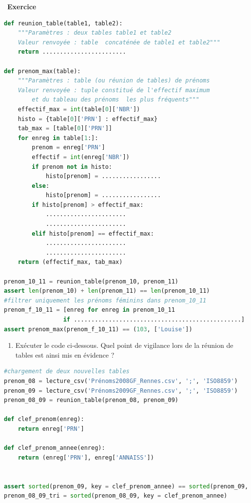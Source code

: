 \documentclass[
  11pt,
]{article}
\providecommand{\tightlist}{%
  \setlength{\itemsep}{0pt}\setlength{\parskip}{0pt}}
\newcounter{exo}
\newenvironment{exercice}[1]
{\par \medskip   \addtocounter{exo}{1} \noindent  
\begin{bclogo}[arrondi =0.1,   noborder = true, logo=\bccrayon, marge=4]{~\textbf{Exercice} \textbf{\theexo} {\itshape #1} }  \par}
{
\end{bclogo}
 \par \bigskip }
\newcounter{def}
\newcounter{histo}
\begin{document}
\begin{exercice}{}
\begin{lstlisting}[language=Python]
def reunion_table(table1, table2):
    """Paramètres : deux tables table1 et table2
    Valeur renvoyée : table  concaténée de table1 et table2"""
    return ........................

def prenom_max(table):
    """Paramètres : table (ou réunion de tables) de prénoms 
    Valeur renvoyée : tuple constitué de l'effectif maximum
        et du tableau des prénoms  les plus fréquents"""
    effectif_max = int(table[0]['NBR'])
    histo = {table[0]['PRN'] : effectif_max}   
    tab_max = [table[0]['PRN']]
    for enreg in table[1:]:
        prenom = enreg['PRN']
        effectif = int(enreg['NBR'])
        if prenom not in histo:
            histo[prenom] = .................
        else:
            histo[prenom] = .................
        if histo[prenom] > effectif_max:
            .......................
            .......................
        elif histo[prenom] == effectif_max:
            .......................
            .......................
    return (effectif_max, tab_max)      

prenom_10_11 = reunion_table(prenom_10, prenom_11)
assert len(prenom_10) + len(prenom_11) == len(prenom_10_11)
#filtrer uniquement les prénoms féminins dans prenom_10_11
prenom_f_10_11 = [enreg for enreg in prenom_10_11 
                 if ................................................]
assert prenom_max(prenom_f_10_11) == (103, ['Louise'])
\end{lstlisting}

\begin{enumerate}
\def\labelenumi{\arabic{enumi}.}
\setcounter{enumi}{4}
\tightlist
\item
  Exécuter le code ci-dessous. Quel point de vigilance lors de la
  réunion de tables est ainsi mis en évidence ?
\end{enumerate}

\begin{lstlisting}[language=Python]
#chargement de deux nouvelles tables
prenom_08 = lecture_csv('Prénoms2008GF_Rennes.csv', ';', 'ISO8859')
prenom_09 = lecture_csv('Prénoms2009GF_Rennes.csv', ';', 'ISO8859')
prenom_08_09 = reunion_table(prenom_08, prenom_09)

def clef_prenom(enreg):
    return enreg['PRN']

def clef_prenom_annee(enreg):
    return (enreg['PRN'], enreg['ANNAISS'])


assert sorted(prenom_09, key = clef_prenom_annee) == sorted(prenom_09, key = clef_prenom)
prenom_08_09_tri = sorted(prenom_08_09, key = clef_prenom_annee) 
\end{lstlisting}


\end{exercice}
\end{document}
